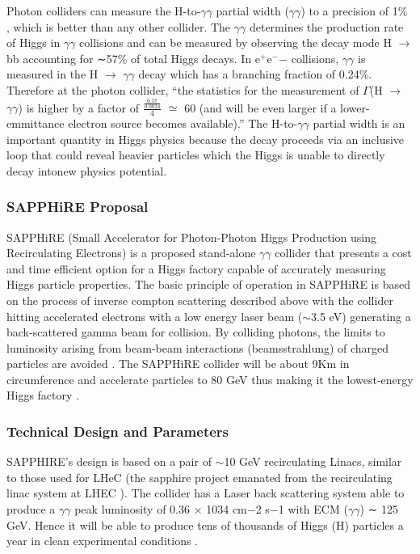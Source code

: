 Photon colliders can measure the H-to-$\gamma\gamma$ partial width ($\gamma\gamma$) to a precision of 1\% \cite{Chou:Higgs}, which is better than any other collider. The $\gamma\gamma$ determines the production rate of Higgs in $\gamma\gamma$ collisions and can be measured by observing the decay mode H $\rightarrow$ bb accounting for ∼57\% of total Higgs decays. In e$^{+}$e$^{-}$− collisions, $\gamma\gamma$ is measured in the H $\rightarrow$ $\gamma\gamma$ decay which has a branching fraction of 0.24\%. Therefore at the photon collider, ``the statistics for the measurement of $\Gamma$(H $\rightarrow$ $\gamma\gamma$) is higher by a factor of $\frac{\frac{0.57}{0.0024}}{4}$ $\simeq$ 60 (and will be even larger if a lower-emmittance electron source becomes available).'' \cite{Telnov:Photons} The H-to-$\gamma\gamma$ partial width is an important quantity in Higgs physics because the decay proceeds via an inclusive loop that could reveal heavier particles which the Higgs is unable to directly decay into\textemdash new physics potential.

\subsubsection{SAPPHiRE Proposal}
SAPPHiRE (Small Accelerator for Photon-Photon Higgs Production using Recirculating Electrons) is a proposed stand-alone $\gamma\gamma$ collider that presents a cost and time efficient option for a Higgs factory capable of accurately measuring Higgs particle properties. The basic principle of operation in SAPPHiRE is based on the process of inverse compton scattering described above with the collider hitting accelerated electrons with a low energy laser beam ($\sim$3.5 eV) generating a back-scattered gamma beam for collision. By colliding photons, the limits to luminosity arising from beam-beam interactions (beamsstrahlung) of charged particles are avoided \cite{Zimmermann:SAPPHiRE}. The SAPPHiRE collider will be about 9Km in circumference and accelerate particles to 80 GeV thus making it the lowest-energy Higgs factory \cite{Bogacz:SAPPHiRE}.

\subsubsection{Technical Design and Parameters}                                                                                                            SAPPHIRE's design is based on a pair of $\sim$10 GeV recirculating Linacs, similar to those used for LHeC (the sapphire project emanated from the recirculating linac system at LHEC ). The collider has a Laser back scattering system able to produce a $\gamma\gamma$ peak luminosity of 0.36 × 1034 cm−2 s−1 with ECM ($\gamma\gamma$) ∼ 125 GeV. Hence it will be able to produce tens of thousands of Higgs (H) particles a year in clean experimental conditions \cite{Bogacz:SAPPHiRE}.

